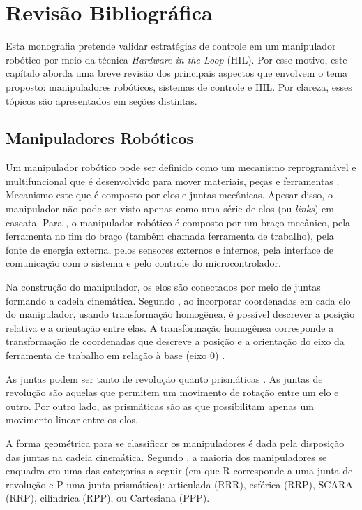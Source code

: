 \chapter{Revisão Bibliográfica}

Esta monografia pretende validar estratégias de controle em um manipulador robótico 
por meio da técnica \textit{Hardware in the Loop} (HIL). Por esse motivo, este capítulo 
aborda uma breve revisão dos principais aspectos que envolvem o tema proposto: manipuladores 
robóticos, sistemas de controle e HIL. Por clareza, esses tópicos são apresentados em seções 
distintas.


\section{Manipuladores Robóticos}

Um manipulador robótico pode ser definido como um mecanismo reprogramável e multifuncional
que é desenvolvido para mover materiais, peças e ferramentas \cite{Murphy:2000:IAR:517685}. 
Mecanismo este que é composto por elos e juntas mecânicas. Apesar disso, o manipulador não pode ser 
visto apenas como uma série de elos (ou \textit{links}) em cascata. Para , 
o manipulador robótico é composto por um braço mecânico, pela ferramenta no fim do braço 
(também chamada ferramenta de trabalho), pela fonte de energia externa, pelos sensores 
externos e internos, pela interface de comunicação com o sistema e pelo controle do microcontrolador.

Na construção do manipulador, os elos são conectados por meio de juntas formando a cadeia 
cinemática. Segundo , ao incorporar coordenadas em cada elo do manipulador, 
usando transformação homogênea, é possível descrever a posição relativa e a orientação entre elas.
A transformação homogênea corresponde a transformação de coordenadas que descreve a posição e a orientação 
do eixo da ferramenta de trabalho em relação à base (eixo $0$) \cite{siciliano}.

As juntas podem ser tanto de revolução quanto prismáticas \cite{paul1981robot}. As juntas de revolução
são aquelas que permitem um movimento de rotação entre um elo e outro. Por outro lado,
as prismáticas são as que possibilitam apenas um movimento linear entre os elos.

A forma geométrica para se classificar os manipuladores é dada pela disposição das juntas 
na cadeia cinemática. Segundo , a maioria dos manipuladores se 
enquadra em uma das categorias a seguir (em que R corresponde a uma junta de revolução 
e P uma junta prismática): articulada (RRR), esférica (RRP), SCARA (RRP), cilíndrica 
(RPP), ou Cartesiana (PPP).

